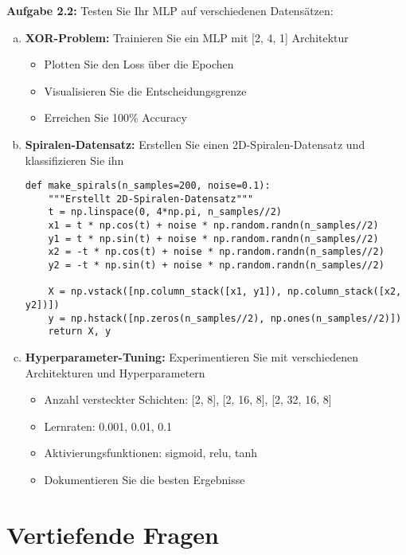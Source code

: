 ﻿\documentclass[12pt,a4paper]{article}
\begin{document}
\textbf{Aufgabe 2.2:} Testen Sie Ihr MLP auf verschiedenen Datensätzen:

\begin{enumerate}[(a)]
    \item \textbf{XOR-Problem:} Trainieren Sie ein MLP mit [2, 4, 1] Architektur 
    \begin{itemize}
        \item Plotten Sie den Loss über die Epochen
        \item Visualisieren Sie die Entscheidungsgrenze
        \item Erreichen Sie 100\% Accuracy
    \end{itemize}
    
    \item \textbf{Spiralen-Datensatz:} Erstellen Sie einen 2D-Spiralen-Datensatz und klassifizieren Sie ihn 
    \begin{lstlisting}
def make_spirals(n_samples=200, noise=0.1):
    """Erstellt 2D-Spiralen-Datensatz"""
    t = np.linspace(0, 4*np.pi, n_samples//2)
    x1 = t * np.cos(t) + noise * np.random.randn(n_samples//2)
    y1 = t * np.sin(t) + noise * np.random.randn(n_samples//2)
    x2 = -t * np.cos(t) + noise * np.random.randn(n_samples//2)
    y2 = -t * np.sin(t) + noise * np.random.randn(n_samples//2)
    
    X = np.vstack([np.column_stack([x1, y1]), np.column_stack([x2, y2])])
    y = np.hstack([np.zeros(n_samples//2), np.ones(n_samples//2)])
    return X, y
    \end{lstlisting}
    
    \item \textbf{Hyperparameter-Tuning:} Experimentieren Sie mit verschiedenen Architekturen und Hyperparametern 
    \begin{itemize}
        \item Anzahl versteckter Schichten: [2, 8], [2, 16, 8], [2, 32, 16, 8]
        \item Lernraten: 0.001, 0.01, 0.1
        \item Aktivierungsfunktionen: sigmoid, relu, tanh
        \item Dokumentieren Sie die besten Ergebnisse
    \end{itemize}
\end{enumerate}

\section{Vertiefende Fragen }
\end{document}
